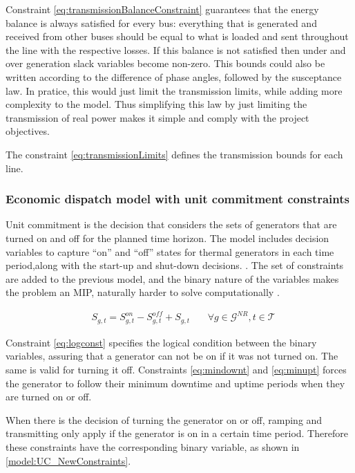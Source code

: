 \documentclass[12pt,LUDisStyle,twosided]{book}
\newcommand{\mc}{\mathcal}
\begin{document}
Constraint \ref{eq:transmissionBalanceConstraint} guarantees that the energy balance is always satisfied for every bus: everything that is generated and received from other buses should be equal to what is loaded and sent throughout the line with the respective losses. If this balance is not satisfied then under and over generation slack variables become non-zero. This bounds could also be written according to the difference of phase angles, followed by the susceptance law. In pratice, this would just limit the transmission limits, while adding more complexity to the model. Thus simplifying this law by just limiting the transmission of real power makes it simple and comply with the project objectives.

The constraint \ref{eq:transmissionLimits} defines the transmission bounds for each line.

\subsubsection{Economic dispatch model with unit commitment constraints}
Unit commitment is the decision that considers the sets of generators that are turned on and off for the planned time horizon. The model includes decision variables to capture ``on'' and ``off'' states for thermal generators in each time period,along with the start-up and shut-down decisions. \citep{palmintier}. The set of constraints are added to the previous model, and the binary nature of the variables makes the problem an MIP, naturally harder to solve computationally \cite{james}. 

\begin{subequations}\label{model:ucConstraints}
\begin{alignat}{4}
& S_{g,t} = S^{on}_{g,t} - S^{off}_{g,t} + S_{g,t}  &~& \forall g \in \mc{G}^{NR} , t \in \mc{T} \label{eq:logconst}\end{alignat} 
\end{subequations}

Constraint \ref{eq:logconst} specifies the logical condition between the binary variables, assuring that a generator can not be on if it was not turned on. The same is valid for turning it off. Constraints \ref{eq:mindownt} and \ref{eq:minupt} forces the generator to follow their minimum downtime and uptime periods when they are turned on or off. 

When there is the decision of turning the generator on or off, ramping and transmitting only apply if the generator is on in a certain time period. Therefore these constraints have the corresponding binary variable, as shown in \ref{model:UC_NewConstraints}. %
\end{document}
